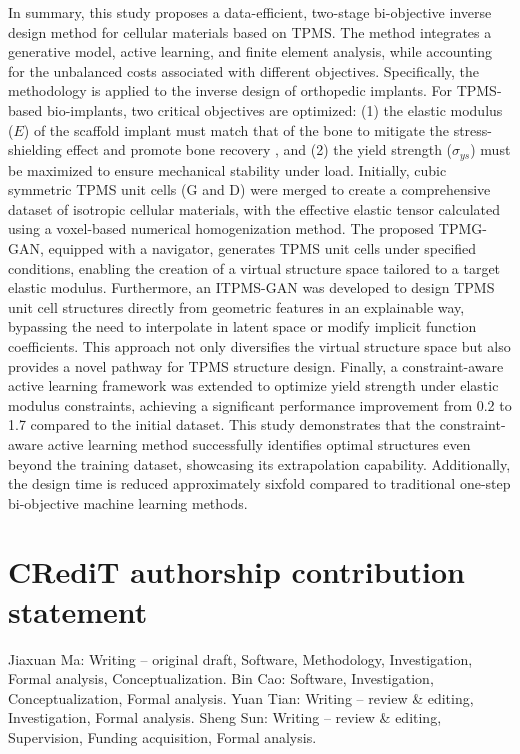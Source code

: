 \documentclass[preprint,review,12pt,authoryear]{elsarticle}
\begin{document}
In summary, this study proposes a data-efficient, two-stage bi-objective inverse design method for cellular materials based on TPMS. The method integrates a generative model, active learning, and finite element analysis, while accounting for the unbalanced costs associated with different objectives. Specifically, the methodology is applied to the inverse design of orthopedic implants. For TPMS-based bio-implants, two critical objectives are optimized: (1) the elastic modulus ($E$) of the scaffold implant must match that of the bone to mitigate the stress-shielding effect and promote bone recovery , and (2) the yield strength ($\sigma_{ys}$) must be maximized to ensure mechanical stability under load. Initially, cubic symmetric TPMS unit cells (G and D) were merged to create a comprehensive dataset of isotropic cellular materials, with the effective elastic tensor calculated using a voxel-based numerical homogenization method. The proposed TPMG-GAN, equipped with a navigator, generates TPMS unit cells under specified conditions, enabling the creation of a virtual structure space tailored to a target elastic modulus. Furthermore, an ITPMS-GAN was developed to design TPMS unit cell structures directly from geometric features in an explainable way, bypassing the need to interpolate in latent space or modify implicit function coefficients. This approach not only diversifies the virtual structure space but also provides a novel pathway for TPMS structure design. Finally, a constraint-aware active learning framework was extended to optimize yield strength under elastic modulus constraints, achieving a significant performance improvement from 0.2 to 1.7 compared to the initial dataset. This study demonstrates that the constraint-aware active learning method successfully identifies optimal structures even beyond the training dataset, showcasing its extrapolation capability. Additionally, the design time is reduced approximately sixfold compared to traditional one-step bi-objective machine learning methods.


\section*{CRediT authorship contribution statement}
Jiaxuan Ma: Writing – original draft, Software, Methodology, Investigation, Formal analysis, Conceptualization. Bin Cao: Software, Investigation, Conceptualization, Formal analysis. Yuan Tian: Writing – review \& editing, Investigation, Formal analysis. Sheng Sun: Writing – review \& editing, Supervision, Funding acquisition, Formal analysis.
\end{document}
